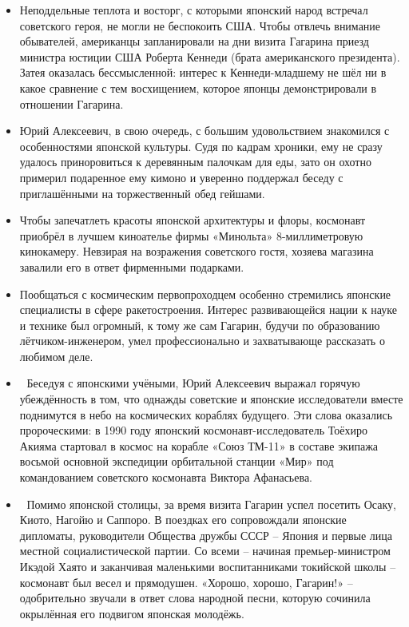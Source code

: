 \begin{itemize}
\item  Неподдельные теплота и восторг, с которыми японский народ встречал
советского героя, не могли не беспокоить США. Чтобы отвлечь внимание
обывателей, американцы запланировали на дни визита Гагарина приезд министра
юстиции США Роберта Кеннеди (брата американского президента). Затея оказалась
бессмысленной: интерес к Кеннеди-младшему не шёл ни в какое сравнение с тем
восхищением, которое японцы демонстрировали в отношении Гагарина.

\item  Юрий Алексеевич, в свою очередь, с большим удовольствием знакомился с
особенностями японской культуры. Судя по кадрам хроники, ему не сразу удалось
приноровиться к деревянным палочкам для еды, зато он охотно примерил подаренное
ему кимоно и уверенно поддержал беседу с приглашёнными на торжественный обед
гейшами. 

\item  Чтобы запечатлеть красоты японской архитектуры и флоры, космонавт приобрёл в
лучшем киноателье фирмы «Минольта» 8-миллиметровую кинокамеру. Невзирая на
возражения советского гостя, хозяева магазина завалили его в ответ фирменными
подарками.

\item  Пообщаться с космическим первопроходцем особенно стремились японские
специалисты в сфере ракетостроения. Интерес развивающейся нации к науке и
технике был огромный, к тому же сам Гагарин, будучи по образованию
лётчиком-инженером, умел профессионально и захватывающе рассказать о любимом
деле. 

\item 🤝 Беседуя с японскими учёными, Юрий Алексеевич выражал горячую убеждённость в
том, что однажды советские и японские исследователи вместе поднимутся в небо на
космических кораблях будущего. Эти слова оказались пророческими: в 1990 году
японский космонавт-исследователь Тоёхиро Акияма стартовал в космос на корабле
«Союз ТМ-11» в составе экипажа восьмой основной экспедиции орбитальной станции
«Мир» под командованием советского космонавта Виктора Афанасьева.

\item 🗻 Помимо японской столицы, за время визита Гагарин успел посетить Осаку,
Киото, Нагойю и Саппоро. В поездках его сопровождали японские дипломаты,
руководители Общества дружбы СССР – Япония и первые лица местной
социалистической партии. Со всеми – начиная премьер-министром Икэдой Хаято и
заканчивая маленькими воспитанниками токийской школы – космонавт был весел и
прямодушен. «Хорошо, хорошо, Гагарин!» – одобрительно звучали в ответ слова
народной песни, которую сочинила окрылённая его подвигом японская молодёжь.

\end{itemize}

